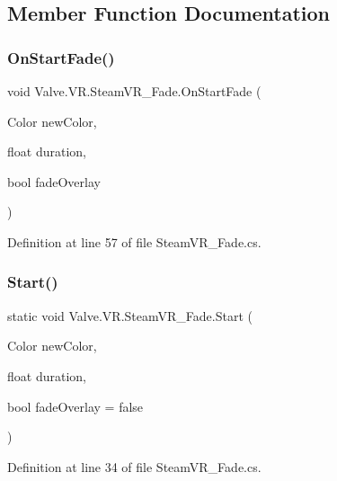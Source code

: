 \subsection{Member Function Documentation}
\mbox{\label{class_valve_1_1_v_r_1_1_steam_v_r___fade_aa3a0bdfba958d100b5bc7a0a7aca3fb1}} 
\subsubsection{\texorpdfstring{OnStartFade()}{OnStartFade()}}
{\footnotesize\ttfamily void Valve.\+V\+R.\+Steam\+V\+R\+\_\+\+Fade.\+On\+Start\+Fade (\begin{DoxyParamCaption}\item[{Color}]{new\+Color,  }\item[{float}]{duration,  }\item[{bool}]{fade\+Overlay }\end{DoxyParamCaption})}



Definition at line 57 of file Steam\+V\+R\+\_\+\+Fade.\+cs.

\mbox{\label{class_valve_1_1_v_r_1_1_steam_v_r___fade_abe8618dbc6e97b16736f6104b9509369}} 
\subsubsection{\texorpdfstring{Start()}{Start()}}
{\footnotesize\ttfamily static void Valve.\+V\+R.\+Steam\+V\+R\+\_\+\+Fade.\+Start (\begin{DoxyParamCaption}\item[{Color}]{new\+Color,  }\item[{float}]{duration,  }\item[{bool}]{fade\+Overlay = {\ttfamily false} }\end{DoxyParamCaption})\hspace{0.3cm}{\ttfamily [static]}}



Definition at line 34 of file Steam\+V\+R\+\_\+\+Fade.\+cs.

\mbox{\label{class_valve_1_1_v_r_1_1_steam_v_r___fade_ae0cfe117cbc12abb4317801382ad5c07}} 
